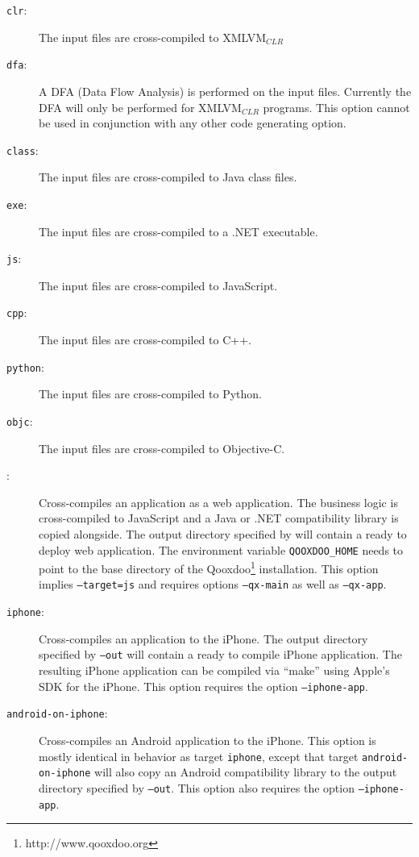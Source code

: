 \documentclass[11pt]{book}
\begin{document}
\begin{description}
\begin{description}
\item[\texttt{clr}:] The input files are cross-compiled to
  XMLVM$_{CLR}$

\item[\texttt{dfa}:] A DFA (Data Flow Analysis) is performed on the
  input files. Currently the DFA will only be performed for
  XMLVM$_{CLR}$ programs. This option cannot be used in conjunction
  with any other code generating option.

\item[\texttt{class}:] The input files are cross-compiled to Java
  class files.

\item[\texttt{exe}:] The input files are cross-compiled to a .NET
  executable.

\item[\texttt{js}:] The input files are cross-compiled to JavaScript.

\item[\texttt{cpp}:] The input files are cross-compiled to C++.

\item[\texttt{python}:] The input files are cross-compiled to Python.

\item[\texttt{objc}:] The input files are cross-compiled to
  Objective-C.

\item[:] Cross-compiles an application as a web
  application. The business logic is cross-compiled to JavaScript
  and a Java or .NET compatibility library is copied alongside.
  The output directory specified by  will contain a
  ready to deploy web application.
  The environment variable \texttt{QOOXDOO\_HOME} needs to point to the
  base directory of the Qooxdoo\footnote{http://www.qooxdoo.org} installation.
  This option implies \texttt{--target=js} and requires options
  \texttt{--qx-main} as well as \texttt{--qx-app}.

\item[\texttt{iphone}:] Cross-compiles an application to the iPhone.
  The output directory specified by \texttt{--out} will contain a
  ready to compile iPhone application.  The resulting iPhone
  application can be compiled via ``make'' using Apple's SDK for the
  iPhone. This option requires the option \texttt{--iphone-app}.

\item[\texttt{android-on-iphone}:] Cross-compiles an Android
  application to the iPhone.  This option is mostly identical in
  behavior as target \texttt{iphone}, except that target
  \texttt{android-on-iphone} will also copy an Android compatibility
  library to the output directory specified by \texttt{--out}. This
  option also requires the option \texttt{--iphone-app}.
\end{description}


\end{description}
\end{document}
